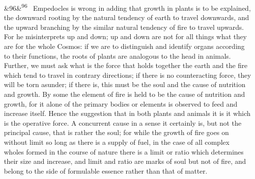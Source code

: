 \documentclass[12pt]{article}
\newcommand{\para}[1][]{\par\noindent\ifx&#1&\else\textsuperscript{\footnotesize #1}~\fi}
\begin{document}
\para[96] Empedocles is wrong in adding that growth in plants is to be explained, the downward rooting by the natural tendency of earth to travel downwards, and the upward branching by the similar natural tendency of fire to travel upwards. For he misinterprets up and down; up and down are not for all things what they are for the whole Cosmos: if we are to distinguish and identify organs according to their functions, the roots of plants are analogous to the head in animals. Further, we must ask what is the force that holds together the earth and the fire which tend to travel in contrary directions; if there is no counteracting force, they will be torn asunder; if there is, this must be the soul and the cause of nutrition and growth. By some the element of fire is held to be the cause of nutrition and growth, for it alone of the primary bodies or elements is observed to feed and increase itself. Hence the suggestion that in both plants and animals it is it which is the operative force. A concurrent cause in a sense it certainly is, but not the principal cause, that is rather the soul; for while the growth of fire goes on without limit so long as there is a supply of fuel, in the case of all complex wholes formed in the course of nature there is a limit or ratio which determines their size and increase, and limit and ratio are marks of soul but not of fire, and belong to the side of formulable essence rather than that of matter.
\end{document}
